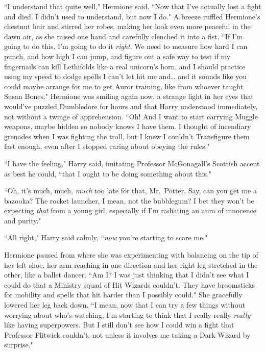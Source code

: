 ``I understand that quite well," Hermione said. ``Now that I've actually lost a fight and died. I didn't used to understand, but now I do." A breeze ruffled Hermione's chestnut hair and stirred her robes, making her look even more peaceful in the dawn air, as she raised one hand and carefully clenched it into a fist. ``If I'm going to do this, I'm going to do it \emph{right}. We need to measure how hard I can punch, and how high I can jump, and figure out a safe way to test if my fingernails can kill Lethifolds like a real unicorn's horn, and I should practice using my speed to dodge spells I can't let hit me and{\ldots} and it sounds like you could maybe arrange for me to get Auror training, like from whoever taught Susan Bones." Hermione was smiling again now, a strange light in her eyes that would've puzzled Dumbledore for hours and that Harry understood immediately, not without a twinge of apprehension. ``Oh! And I want to start carrying Muggle weapons, maybe hidden so nobody knows I have them. I thought of incendiary grenades when I was fighting the troll, but I knew I couldn't Transfigure them fast enough, even after I stopped caring about obeying the rules."

``I have the feeling," Harry said, imitating Professor McGonagall's Scottish accent as best he could, ``that I ought to be doing something about this."

``Oh, it's much, much, \emph{much} too late for that, Mr.~Potter. Say, can you get me a bazooka? The rocket launcher, I mean, not the bubblegum? I bet they won't be expecting \emph{that} from a young girl, especially if I'm radiating an aura of innocence and purity."

``All right," Harry said calmly, ``\emph{now} you're starting to scare me."

Hermione paused from where she was experimenting with balancing on the tip of her left shoe, her arm reaching in one direction and her right leg stretched in the other, like a ballet dancer. ``Am I? I was just thinking that I didn't see what I could do that a Ministry squad of Hit Wizards couldn't. They have broomsticks for mobility and spells that hit harder than I possibly could." She gracefully lowered her leg back down. ``I mean, now that I can try a few things without worrying about who's watching, I'm starting to think that I really really \emph{really} like having superpowers. But I still don't see how I could win a fight that Professor Flitwick couldn't, not unless it involves me taking a Dark Wizard by surprise."

